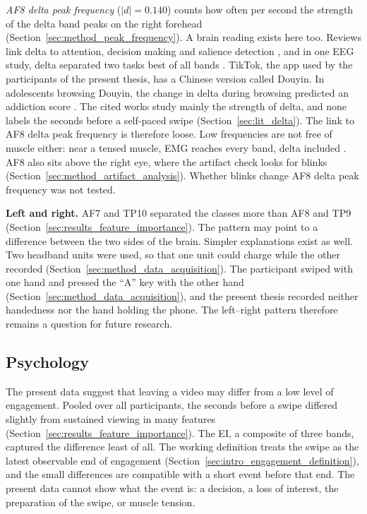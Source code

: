 \documentclass[12pt,a4paper]{report}
\begin{document}
\emph{AF8 delta peak frequency} (\(|d| = 0.140\)) counts how often per second the strength of the delta band peaks on the right forehead (Section~\ref{sec:method_peak_frequency}). A brain reading exists here too. Reviews link delta to attention, decision making and salience detection \cite{guntekin_review_2016, knyazev_eeg_2012}, and in one EEG study, delta separated two tasks best of all bands \cite{ovi_frequency_2026}. TikTok, the app used by the participants of the present thesis, has a Chinese version called Douyin. In adolescents browsing Douyin, the change in delta during browsing predicted an addiction score \cite{xu_neural_2024}. The cited works study mainly the strength of delta, and none labels the seconds before a self-paced swipe (Section~\ref{sec:lit_delta}). The link to AF8 delta peak frequency is therefore loose. Low frequencies are not free of muscle either: near a tensed muscle, EMG reaches every band, delta included \cite{goncharova_emg_2003}. AF8 also sits above the right eye, where the artifact check looks for blinks (Section~\ref{sec:method_artifact_analysis}). Whether blinks change AF8 delta peak frequency was not tested.

\textbf{Left and right.} AF7 and TP10 separated the classes more than AF8 and TP9 (Section~\ref{sec:results_feature_importance}). The pattern may point to a difference between the two sides of the brain. Simpler explanations exist as well. Two headband units were used, so that one unit could charge while the other recorded (Section~\ref{sec:method_data_acquisition}). The participant swiped with one hand and pressed the ``A'' key with the other hand (Section~\ref{sec:method_data_acquisition}), and the present thesis recorded neither handedness nor the hand holding the phone. The left--right pattern therefore remains a question for future research.

\subsection{Psychology}

The present data suggest that leaving a video may differ from a low level of engagement. Pooled over all participants, the seconds before a swipe differed slightly from sustained viewing in many features (Section~\ref{sec:results_feature_importance}). The EI, a composite of three bands, captured the difference least of all. The working definition treats the swipe as the latest observable end of engagement (Section~\ref{sec:intro_engagement_definition}), and the small differences are compatible with a short event before that end. The present data cannot show what the event is: a decision, a loss of interest, the preparation of the swipe, or muscle tension.
\end{document}
